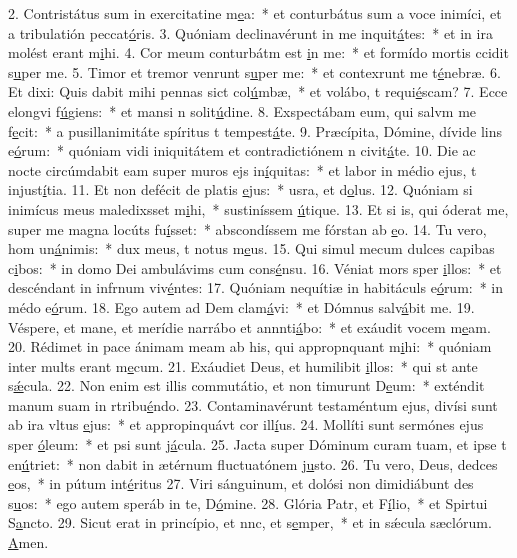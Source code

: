 2. Contristátus sum in exercitatine m\uline{e}a:~* et conturbátus sum a voce inimíci, et a tribulatión peccat\uline{ó}ris.
3. Quóniam declinavérunt in me inquit\uline{á}tes:~* et in ira molést erant m\uline{i}hi.
4. Cor meum conturbátm est \uline{i}n me:~* et formído mortis ccidit s\uline{u}per me.
5. Timor et tremor venrunt s\uline{u}per me:~* et contexrunt me t\uline{é}nebræ.
6. Et dixi: Quis dabit mihi pennas sict col\uline{ú}mbæ,~* et volábo, t requi\uline{é}scam?
7. Ecce elongvi f\uline{ú}giens:~* et mansi n solit\uline{ú}dine.
8. Exspectábam eum, qui salvm me f\uline{e}cit:~* a pusillanimitáte spíritus t tempest\uline{á}te.
9. Præcípita, Dómine, dívide lins e\uline{ó}rum:~* quóniam vidi iniquitátem et contradictiónem n civit\uline{á}te.
10. Die ac nocte circúmdabit eam super muros ejs in\uline{í}quitas:~* et labor in médio ejus, t injust\uline{í}tia.
11. Et non defécit de platis \uline{e}jus:~* usra, et d\uline{o}lus.
12. Quóniam si inimícus meus maledixsset m\uline{i}hi,~* sustiníssem \uline{ú}tique.
13. Et si is, qui óderat me, super me magna locúts fu\uline{í}sset:~* abscondíssem me fórstan ab \uline{e}o.
14. Tu vero, hom un\uline{á}nimis:~* dux meus, t notus m\uline{e}us.
15. Qui simul mecum dulces capibas c\uline{i}bos:~* in domo Dei ambulávims cum cons\uline{é}nsu.
16. Véniat mors sper \uline{i}llos:~* et descéndant in infrnum viv\uline{é}ntes:
17. Quóniam nequítiæ in habitáculs e\uline{ó}rum:~* in médo e\uline{ó}rum.
18. Ego autem ad Dem clam\uline{á}vi:~* et Dómnus salv\uline{á}bit me.
19. Véspere, et mane, et merídie narrábo et annnti\uline{á}bo:~* et exáudit vocem m\uline{e}am.
20. Rédimet in pace ánimam meam ab his, qui appropnquant m\uline{i}hi:~* quóniam inter mults erant m\uline{e}cum.
21. Exáudiet Deus, et humilibit \uline{i}llos:~* qui st ante s\uline{ǽ}cula.
22. Non enim est illis commutátio, et non timurunt D\uline{e}um:~* exténdit manum suam in rtribu\uline{é}ndo.
23. Contaminavérunt testaméntum ejus, divísi sunt ab ira vltus \uline{e}jus:~* et appropinquávt cor ill\uline{í}us.
24. Mollíti sunt sermónes ejus sper \uline{ó}leum:~* et psi sunt j\uline{á}cula.
25. Jacta super Dóminum curam tuam, et ipse t en\uline{ú}triet:~* non dabit in ætérnum fluctuatónem j\uline{u}sto.
26. Tu vero, Deus, dedces \uline{e}os,~* in pútum int\uline{é}ritus
27. Viri sánguinum, et dolósi non dimidiábunt des s\uline{u}os:~* ego autem speráb in te, D\uline{ó}mine.
28. Glória Patr, et F\uline{í}lio,~* et Spirtui S\uline{a}ncto.
29. Sicut erat in princípio, et nnc, et s\uline{e}mper,~* et in sǽcula sæclórum. \uline{A}men.
